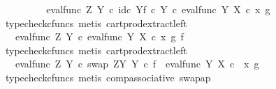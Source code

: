 \begin{isabellebody}
\ \ \ \ \isamarkupfalse%
\ \isamarkupfalse%
\ {\isachardoublequoteopen}{\isachardot}{\kern0pt}{\isachardot}{\kern0pt}{\isachardot}{\kern0pt}\ {\isacharequal}{\kern0pt}\ eval{\isacharunderscore}{\kern0pt}func\ Z\ Y\ {\isasymcirc}\isactrlsub c\ {\isasymlangle}id\isactrlsub c\ Y{\isacharcomma}{\kern0pt}f\ {\isasymcirc}\isactrlsub c\ {\isasymbeta}\isactrlbsub Y\isactrlesub {\isasymrangle}\ {\isasymcirc}\isactrlsub c\ eval{\isacharunderscore}{\kern0pt}func\ Y\ X\ {\isasymcirc}\isactrlsub c\ {\isasymlangle}x\ {\isacharcomma}{\kern0pt}g{\isasymrangle}{\isachardoublequoteclose}\isanewline
\ \ \ \ \ \ \isamarkupfalse%
\ {\isacharparenleft}{\kern0pt}typecheck{\isacharunderscore}{\kern0pt}cfuncs{\isacharcomma}{\kern0pt}\ metis\ cart{\isacharunderscore}{\kern0pt}prod{\isacharunderscore}{\kern0pt}extract{\isacharunderscore}{\kern0pt}left{\isacharparenright}{\kern0pt}\isanewline
\ \ \ \ \isamarkupfalse%
\ \isamarkupfalse%
\ {\isachardoublequoteopen}{\isachardot}{\kern0pt}{\isachardot}{\kern0pt}{\isachardot}{\kern0pt}\ {\isacharequal}{\kern0pt}\ eval{\isacharunderscore}{\kern0pt}func\ Z\ Y\ {\isasymcirc}\isactrlsub c\ {\isasymlangle}eval{\isacharunderscore}{\kern0pt}func\ Y\ X\ {\isasymcirc}\isactrlsub c\ {\isasymlangle}x\ {\isacharcomma}{\kern0pt}g{\isasymrangle}\ {\isacharcomma}{\kern0pt}f{\isasymrangle}{\isachardoublequoteclose}\isanewline
\ \ \ \ \ \ \isamarkupfalse%
\ {\isacharparenleft}{\kern0pt}typecheck{\isacharunderscore}{\kern0pt}cfuncs{\isacharcomma}{\kern0pt}\ metis\ cart{\isacharunderscore}{\kern0pt}prod{\isacharunderscore}{\kern0pt}extract{\isacharunderscore}{\kern0pt}left{\isacharparenright}{\kern0pt}\isanewline
\ \ \ \ \isamarkupfalse%
\ \isamarkupfalse%
\ {\isachardoublequoteopen}{\isachardot}{\kern0pt}{\isachardot}{\kern0pt}{\isachardot}{\kern0pt}\ {\isacharequal}{\kern0pt}\ {\isacharparenleft}{\kern0pt}eval{\isacharunderscore}{\kern0pt}func\ Z\ Y\ {\isasymcirc}\isactrlsub c\ swap\ {\isacharparenleft}{\kern0pt}Z\isactrlbsup Y\isactrlesup {\isacharparenright}{\kern0pt}\ Y{\isacharparenright}{\kern0pt}\ {\isasymcirc}\isactrlsub c\ {\isasymlangle}f\ {\isacharcomma}{\kern0pt}\ eval{\isacharunderscore}{\kern0pt}func\ Y\ X\ {\isasymcirc}\isactrlsub c\ \ {\isasymlangle}x{\isacharcomma}{\kern0pt}\ g{\isasymrangle}{\isasymrangle}{\isachardoublequoteclose}\isanewline
\ \ \ \ \ \ \isamarkupfalse%
\ {\isacharparenleft}{\kern0pt}typecheck{\isacharunderscore}{\kern0pt}cfuncs{\isacharcomma}{\kern0pt}\ metis\ comp{\isacharunderscore}{\kern0pt}associative{}\ swap{\isacharunderscore}{\kern0pt}ap{\isacharparenright}{\kern0pt}\isanewline

\end{isabellebody}
